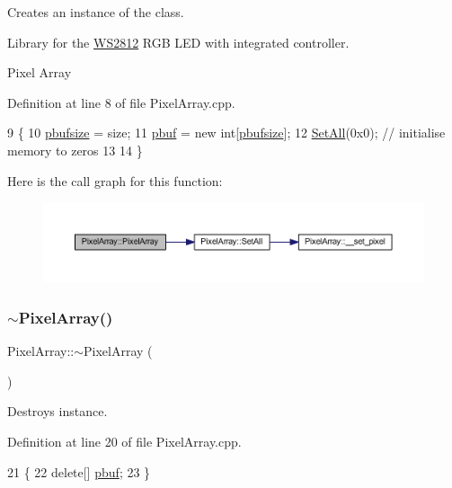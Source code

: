 Creates an instance of the class. 

Library for the \hyperlink{class_w_s2812}{W\+S2812} R\+GB L\+ED with integrated controller.

Pixel Array 

Definition at line 8 of file Pixel\+Array.\+cpp.


\begin{DoxyCode}
9 \{
10     \hyperlink{class_pixel_array_aca29e70f9b643bff3733ab2e694439a1}{pbufsize} = size;
11     \hyperlink{class_pixel_array_ab0109a336e69a9942b2723e43ee715d7}{pbuf} = \textcolor{keyword}{new} \textcolor{keywordtype}{int}[\hyperlink{class_pixel_array_aca29e70f9b643bff3733ab2e694439a1}{pbufsize}];
12     \hyperlink{class_pixel_array_a5f560dcef3d1582614858969b20da89d}{SetAll}(0x0); \textcolor{comment}{// initialise memory to zeros}
13 
14 \}
\end{DoxyCode}
Here is the call graph for this function\+:\nopagebreak
\begin{figure}[H]
\begin{center}
\leavevmode
\includegraphics[width=350pt]{class_pixel_array_a86359f5eda90e0d12e3aa2c102ade21d_cgraph}
\end{center}
\end{figure}
\mbox{\label{class_pixel_array_a9f4d10fcbd08290dfdecafb2ed4ad687}} 
\subsubsection{\texorpdfstring{$\sim$\+Pixel\+Array()}{~PixelArray()}}
{\footnotesize\ttfamily Pixel\+Array\+::$\sim$\+Pixel\+Array (\begin{DoxyParamCaption}{ }\end{DoxyParamCaption})}

Destroys instance. 

Definition at line 20 of file Pixel\+Array.\+cpp.


\begin{DoxyCode}
21 \{
22     \textcolor{keyword}{delete}[] \hyperlink{class_pixel_array_ab0109a336e69a9942b2723e43ee715d7}{pbuf};
23 \}
\end{DoxyCode}


